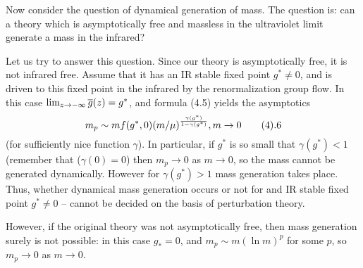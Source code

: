 Now consider the question of dynamical generation of mass. The question is:
can a theory which is asymptotically free and massless in the ultraviolet 
limit generate a mass in the infrared? 

Let us try to answer this question. Since our theory is asymptotically 
free, it is not infrared free. Assume that it has an IR stable 
fixed point $g^*\ne 0$, and is driven to this fixed point in the infrared
by the renormalization group flow. In this case $\lim_{z\to -\infty}\overline{g}(z)=
g^*$, and formula (4.5) yields the asymptotics
$$
m_p\sim mf(g^*,0)(m/\mu)^{\frac{\gamma(g^*)}{1-\gamma(g^*)}}, m\to 0\tag 4.6
$$
(for sufficiently nice function $\gamma$). In particular, if 
$g^*$ is so small that $\gamma(g^*)<1$ (remember that ($\gamma(0)=0$)
then $m_p\to 0$ as $m\to 0$, 
so the mass cannot be generated dynamically. However
for $\gamma(g^*)>1$ mass generation takes place. Thus,  
whether dynamical mass generation occurs or not
for and IR stable fixed point $g^*\ne 0$
-- cannot be decided on the basis of perturbation theory. 

However, 
if the original theory was not asymptotically free, then mass generation 
surely is not possible: in this case $g_*=0$, and 
$m_p\sim m(\ln m)^p$ for some $p$, so $m_p\to 0$ as $m\to 0$. 

